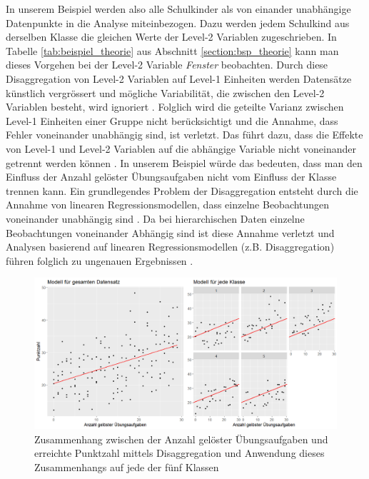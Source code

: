 \documentclass[12pt]{article}\usepackage[]{graphicx}\usepackage[]{color}
\begin{document}
In unserem Beispiel werden also alle Schulkinder als von einander unabhängige Datenpunkte in die Analyse miteinbezogen. Dazu werden jedem Schulkind aus derselben Klasse die gleichen Werte der Level-2 Variablen zugeschrieben. In Tabelle \ref{tab:beispiel_theorie} aus Abschnitt \ref{section:bsp_theorie} kann man dieses Vorgehen bei der Level-2 Variable \textit{Fenster} beobachten. Durch diese Disaggregation von Level-2 Variablen auf Level-1 Einheiten werden Datensätze künstlich vergrössert und mögliche Variabilität, die zwischen den Level-2 Variablen besteht, wird ignoriert \citep{SnijdersTomA.B2012Ma:a, woltman2012introduction}. Folglich wird die geteilte Varianz zwischen Level-1 Einheiten einer Gruppe nicht berücksichtigt und die Annahme, dass Fehler voneinander unabhängig sind, ist verletzt. Das führt dazu, dass die Effekte von Level-1 und Level-2 Variablen auf die abhängige Variable nicht voneinander getrennt werden können \citep{woltman2012introduction}. In unserem Beispiel würde das bedeuten, dass man den Einfluss der Anzahl gelöster Übungsaufgaben nicht vom Einfluss der Klasse trennen kann. Ein grundlegendes Problem der Disaggregation entsteht durch die Annahme von linearen Regressionsmodellen, dass einzelne Beobachtungen voneinander unabhängig sind \citep{woltman2012introduction}. Da bei hierarchischen Daten einzelne Beobachtungen voneinander Abhängig sind ist diese Annahme verletzt und Analysen basierend auf linearen Regressionsmodellen (z.B. Disaggregation) führen folglich zu ungenauen Ergebnissen \citep{andrew_data, SnijdersTomA.B2012Ma:a, woltman2012introduction}.

\begin{figure}[t!]
\centering
\includegraphics[width = \textwidth]{disaggregation_combined}
\caption{Zusammenhang zwischen der Anzahl gelöster Übungsaufgaben und erreichte Punktzahl mittels Disaggregation und Anwendung dieses Zusammenhangs auf jede der fünf Klassen}
\label{fig:disaggregation}
\end{figure}
\end{document}
